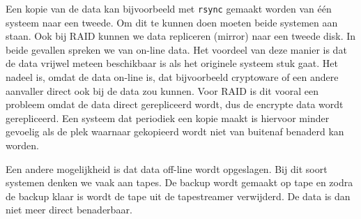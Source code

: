 Een kopie van de data kan bijvoorbeeld met \texttt{rsync} gemaakt worden van \'e\'en systeem naar een tweede. Om dit te kunnen doen moeten beide systemen aan staan. Ook bij RAID kunnen we data repliceren (mirror) naar een tweede disk. In beide gevallen spreken we van on-line data. Het voordeel van deze manier is dat de data vrijwel meteen beschikbaar is als het originele systeem stuk gaat. Het nadeel is, omdat de data on-line is, dat bijvoorbeeld cryptoware of een andere aanvaller direct ook bij de data zou kunnen. Voor RAID is dit vooral een probleem omdat de data direct gerepliceerd wordt, dus de encrypte data wordt gerepliceerd. Een systeem dat periodiek een kopie maakt is hiervoor minder gevoelig als de plek waarnaar gekopieerd wordt niet van buitenaf benaderd kan worden.

Een andere mogelijkheid is dat data off-line wordt opgeslagen. Bij dit soort systemen denken we vaak aan tapes. De backup wordt gemaakt op tape en zodra de backup klaar is wordt de tape uit de tapestreamer verwijderd. De data is dan niet meer direct benaderbaar.

